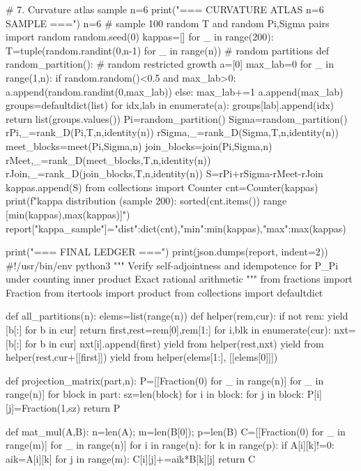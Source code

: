 # 7. Curvature atlas sample n=6
print("\n=== CURVATURE ATLAS n=6 SAMPLE ===")
n=6
# sample 100 random T and random Pi,Sigma pairs
import random
random.seed(0)
kappas=[]
for _ in range(200):
    T=tuple(random.randint(0,n-1) for _ in range(n))
    # random partitions
    def random_partition():
        # random restricted growth
        a=[0]
        max_lab=0
        for _ in range(1,n):
            if random.random()<0.5 and max_lab>0:
                a.append(random.randint(0,max_lab))
            else:
                max_lab+=1
                a.append(max_lab)
        groups=defaultdict(list)
        for idx,lab in enumerate(a):
            groups[lab].append(idx)
        return list(groups.values())
    Pi=random_partition()
    Sigma=random_partition()
    rPi,_=rank_D(Pi,T,n,identity(n))
    rSigma,_=rank_D(Sigma,T,n,identity(n))
    meet_blocks=meet(Pi,Sigma,n)
    join_blocks=join(Pi,Sigma,n)
    rMeet,_=rank_D(meet_blocks,T,n,identity(n))
    rJoin,_=rank_D(join_blocks,T,n,identity(n))
    S=rPi+rSigma-rMeet-rJoin
    kappas.append(S)
from collections import Counter
cnt=Counter(kappas)
print(f"kappa distribution (sample 200): {sorted(cnt.items())} range [{min(kappas)},{max(kappas)}]")
report["kappa_sample"]={"dist":dict(cnt),"min":min(kappas),"max":max(kappas)}

print("\n=== FINAL LEDGER ===")
print(json.dumps(report, indent=2))
#!/usr/bin/env python3
"""
Verify self-adjointness and idempotence for P_Pi under counting inner product
Exact rational arithmetic
"""
from fractions import Fraction
from itertools import product
from collections import defaultdict

def all_partitions(n):
    elems=list(range(n))
    def helper(rem,cur):
        if not rem:
            yield [b[:] for b in cur]
            return
        first,rest=rem[0],rem[1:]
        for i,blk in enumerate(cur):
            nxt=[b[:] for b in cur]
            nxt[i].append(first)
            yield from helper(rest,nxt)
        yield from helper(rest,cur+[[first]])
    yield from helper(elems[1:], [[elems[0]]])

def projection_matrix(part,n):
    P=[[Fraction(0) for _ in range(n)] for _ in range(n)]
    for block in part:
        sz=len(block)
        for i in block:
            for j in block:
                P[i][j]=Fraction(1,sz)
    return P

def mat_mul(A,B):
    n=len(A); m=len(B[0]); p=len(B)
    C=[[Fraction(0) for _ in range(m)] for _ in range(n)]
    for i in range(n):
        for k in range(p):
            if A[i][k]!=0:
                aik=A[i][k]
                for j in range(m):
                    C[i][j]+=aik*B[k][j]
    return C

